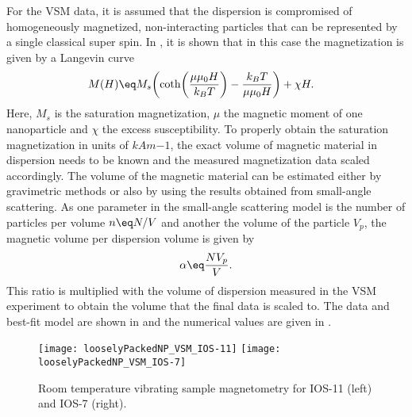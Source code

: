 \documentclass[\main/dresen_thesis.tex]{subfiles}
\begin{document}
  For the VSM data, it is assumed that the dispersion is compromised of homogeneously magnetized, non-interacting particles that can be represented by a single classical super spin.
  In , it is shown that in this case the magnetization is given by a Langevin curve
  \begin{align}
    M(H) \eq& M_s \biggl( \coth \biggl(\frac{\mu \mu_0 H}{k_B T} \biggr) - \frac{k_B T}{\mu \mu_0 H} \biggr) + \chi H.
  \end{align}
  Here, $M_s$ is the saturation magnetization, $\mu$ the magnetic moment of one nanoparticle and $\chi$ the excess susceptibility.
  To properly obtain the saturation magnetization in units of $\unit{kAm{-1}}$, the exact volume of magnetic material in dispersion needs to be known and the measured magnetization data scaled accordingly.
  The volume of the magnetic material can be estimated either by gravimetric methods or also by using the results obtained from small-angle scattering.
  As one parameter in the small-angle scattering model is the number of particles per volume $n \eq N/V$ and another the volume of the particle $V_p$, the magnetic volume per dispersion volume is given by
  \begin{align}
    \alpha \eq \frac{N V_p}{V}.
  \end{align}
  This ratio is multiplied with the volume of dispersion measured in the VSM experiment to obtain the volume that the final data is scaled to.
  The data and best-fit model are shown in  and the numerical values are given in .

  \begin{figure}[tb]
    \centering
    \texttt{[image: looselyPackedNP\_VSM\_IOS-11]}
    \texttt{[image: looselyPackedNP\_VSM\_IOS-7]}
    \caption{\label{fig:looselyPackedNP:nanoparticle:vsm}Room temperature vibrating sample magnetometry for IOS-11 (left) and IOS-7 (right).}
  \end{figure}
\end{document}
